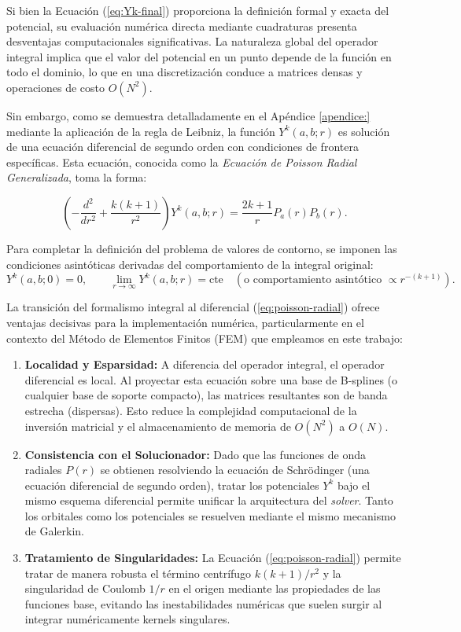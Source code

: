 \documentclass[12pt, a4paper, oneside, spanish]{book}
\begin{document}
Si bien la Ecuación (\cref{eq:Yk-final}) proporciona la definición formal y exacta del potencial, su evaluación numérica directa mediante cuadraturas presenta desventajas computacionales significativas. La naturaleza global del operador integral implica que el valor del potencial en un punto depende de la función en todo el dominio, lo que en una discretización conduce a matrices densas y operaciones de costo $O(N^2)$.

Sin embargo, como se demuestra detalladamente en el Apéndice \cref{apendice:} mediante la aplicación de la regla de Leibniz, la función $Y^k(a,b;r)$ es solución de una ecuación diferencial de segundo orden con condiciones de frontera específicas. Esta ecuación, conocida como la \textit{Ecuación de Poisson Radial Generalizada}, toma la forma:

\begin{equation}
\label{eq:poisson-radial}
    \left( -\frac{d^2}{dr^2} + \frac{k(k+1)}{r^2} \right) Y^k(a,b;r) = \frac{2k+1}{r} P_a(r)P_b(r).
\end{equation}

Para completar la definición del problema de valores de contorno, se imponen las condiciones asintóticas derivadas del comportamiento de la integral original:
\begin{equation}
    Y^k(a,b; 0) = 0, \quad \quad \lim_{r \to \infty} Y^k(a,b; r) = \text{cte} \quad (\text{o comportamiento asintótico } \propto r^{-(k+1)}).
\end{equation}

La transición del formalismo integral al diferencial (\cref{eq:poisson-radial}) ofrece ventajas decisivas para la implementación numérica, particularmente en el contexto del Método de Elementos Finitos (FEM) que empleamos en este trabajo:

\begin{enumerate}
    \item \textbf{Localidad y Esparsidad:} A diferencia del operador integral, el operador diferencial es local. Al proyectar esta ecuación sobre una base de B-splines (o cualquier base de soporte compacto), las matrices resultantes son de banda estrecha (dispersas). Esto reduce la complejidad computacional de la inversión matricial y el almacenamiento de memoria de $O(N^2)$ a $O(N)$.
    
    \item \textbf{Consistencia con el Solucionador:} Dado que las funciones de onda radiales $P(r)$ se obtienen resolviendo la ecuación de Schrödinger (una ecuación diferencial de segundo orden), tratar los potenciales $Y^k$ bajo el mismo esquema diferencial permite unificar la arquitectura del \textit{solver}. Tanto los orbitales como los potenciales se resuelven mediante el mismo mecanismo de Galerkin.
    
    \item \textbf{Tratamiento de Singularidades:} La Ecuación (\cref{eq:poisson-radial}) permite tratar de manera robusta el término centrífugo $k(k+1)/r^2$ y la singularidad de Coulomb $1/r$ en el origen mediante las propiedades de las funciones base, evitando las inestabilidades numéricas que suelen surgir al integrar numéricamente kernels singulares.
\end{enumerate}
\end{document}
